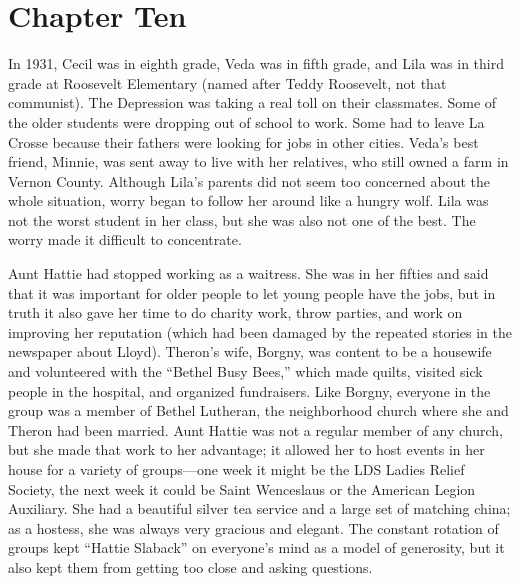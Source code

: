 \documentclass[
  american,
  letterpaper,
]{book}
\begin{document}

\chapter{Chapter Ten}\label{chapter-ten}

In 1931, Cecil was in eighth grade, Veda was in fifth grade, and Lila
was in third grade at Roosevelt Elementary (named after Teddy Roosevelt,
not that communist). The Depression was taking a real toll on their
classmates. Some of the older students were dropping out of school to
work. Some had to leave La Crosse because their fathers were looking for
jobs in other cities. Veda's best friend, Minnie, was sent away to live
with her relatives, who still owned a farm in Vernon County. Although
Lila's parents did not seem too concerned about the whole situation,
worry began to follow her around like a hungry wolf. Lila was not the
worst student in her class, but she was also not one of the best. The
worry made it difficult to concentrate.

Aunt Hattie had stopped working as a waitress. She was in her fifties
and said that it was important for older people to let young people have
the jobs, but in truth it also gave her time to do charity work, throw
parties, and work on improving her reputation (which had been damaged by
the repeated stories in the newspaper about Lloyd). Theron's wife,
Borgny, was content to be a housewife and volunteered with the ``Bethel
Busy Bees,'' which made quilts, visited sick people in the hospital, and
organized fundraisers. Like Borgny, everyone in the group was a member
of Bethel Lutheran, the neighborhood church where she and Theron had
been married. Aunt Hattie was not a regular member of any church, but
she made that work to her advantage; it allowed her to host events in
her house for a variety of groups---one week it might be the LDS Ladies
Relief Society, the next week it could be Saint Wenceslaus or the
American Legion Auxiliary. She had a beautiful silver tea service and a
large set of matching china; as a hostess, she was always very gracious
and elegant. The constant rotation of groups kept ``Hattie Slaback'' on
everyone's mind as a model of generosity, but it also kept them from
getting too close and asking questions.
\end{document}
